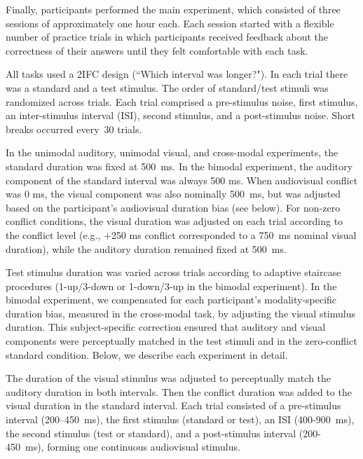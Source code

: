 \documentclass{biorxiv}
\begin{document}
Finally, participants performed the main experiment, which consisted of three sessions of approximately one hour each. Each session started with a flexible number of practice trials in which participants received feedback about the correctness of their answers until they felt comfortable with each task.

All tasks used a 2IFC design (``Which interval was longer?"). In each trial there was a standard and a test stimulus. The order of standard/test stimuli was randomized across trials. Each trial comprised a pre-stimulus noise, first stimulus, an inter-stimulus interval (ISI), second stimulus, and a post-stimulus noise. Short breaks occurred every~30 trials.

In the unimodal auditory, unimodal visual, and cross-modal experiments, the standard duration was fixed at 500~ms. In the bimodal experiment, the auditory component of the standard interval was always 500 ms. When audiovisual conflict was 0 ms, the visual component was also nominally 500~ms, but was adjusted based on the participant's audiovisual duration bias (see below). For non-zero conflict conditions, the visual duration was adjusted on each trial according to the conflict level (e.g., +250 ms conflict corresponded to a 750~ms nominal visual duration), while the auditory duration remained fixed at 500~ms.

Test stimulus duration was varied across trials according to adaptive staircase procedures (1-up/3-down or 1-down/3-up in the bimodal experiment). In the bimodal experiment, we compensated for each participant's modality-specific duration bias, measured in the cross-modal task, by adjusting the visual stimulus duration. This subject-specific correction ensured that auditory and visual components were perceptually matched in the test stimuli and in the zero-conflict standard condition. Below, we describe each experiment in detail.

The duration of the visual stimulus was adjusted to perceptually match the auditory duration in both intervals. Then the conflict duration was added to the visual duration in the standard interval. Each trial consisted of a pre-stimulus interval (200--450~ms), the first stimulus (standard or test), an ISI (400-900~ms), the second stimulus (test or standard), and a post-stimulus interval (200-450~ms), forming one continuous audiovisual stimulus.
\end{document}
